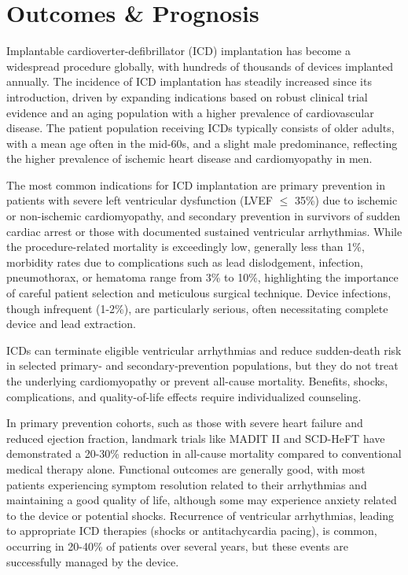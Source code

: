 \section*{Outcomes \& Prognosis}
Implantable cardioverter-defibrillator (ICD) implantation has become a widespread procedure globally, with hundreds of thousands of devices implanted annually. The incidence of ICD implantation has steadily increased since its introduction, driven by expanding indications based on robust clinical trial evidence and an aging population with a higher prevalence of cardiovascular disease. The patient population receiving ICDs typically consists of older adults, with a mean age often in the mid-60s, and a slight male predominance, reflecting the higher prevalence of ischemic heart disease and cardiomyopathy in men. 

The most common indications for ICD implantation are primary prevention in patients with severe left ventricular dysfunction (LVEF $\leq$ 35\%) due to ischemic or non-ischemic cardiomyopathy, and secondary prevention in survivors of sudden cardiac arrest or those with documented sustained ventricular arrhythmias. While the procedure-related mortality is exceedingly low, generally less than 1\%, morbidity rates due to complications such as lead dislodgement, infection, pneumothorax, or hematoma range from 3\% to 10\%, highlighting the importance of careful patient selection and meticulous surgical technique. Device infections, though infrequent (1-2\%), are particularly serious, often necessitating complete device and lead extraction.

ICDs can terminate eligible ventricular arrhythmias and reduce sudden-death risk in selected primary- and secondary-prevention populations, but they do not treat the underlying cardiomyopathy or prevent all-cause mortality. Benefits, shocks, complications, and quality-of-life effects require individualized counseling.

In primary prevention cohorts, such as those with severe heart failure and reduced ejection fraction, landmark trials like MADIT II and SCD-HeFT have demonstrated a 20-30\% reduction in all-cause mortality compared to conventional medical therapy alone. Functional outcomes are generally good, with most patients experiencing symptom resolution related to their arrhythmias and maintaining a good quality of life, although some may experience anxiety related to the device or potential shocks. Recurrence of ventricular arrhythmias, leading to appropriate ICD therapies (shocks or antitachycardia pacing), is common, occurring in 20-40\% of patients over several years, but these events are successfully managed by the device. 

